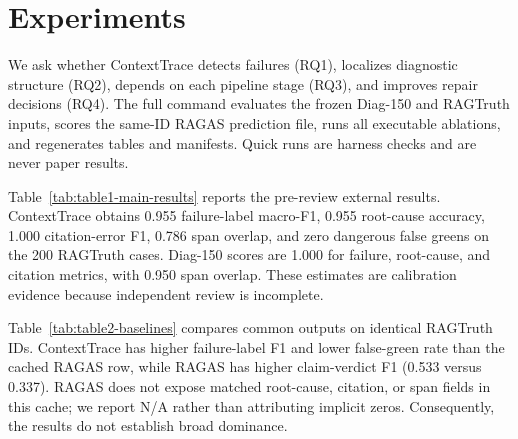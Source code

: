 \section{Experiments}
We ask whether ContextTrace detects failures (RQ1), localizes diagnostic
structure (RQ2), depends on each pipeline stage (RQ3), and improves repair
decisions (RQ4). The full command evaluates the frozen Diag-150 and RAGTruth
inputs, scores the same-ID RAGAS prediction file, runs all executable ablations,
and regenerates tables and manifests. Quick runs are harness checks and are
never paper results.

Table~\ref{tab:table1-main-results} reports the pre-review external results.
ContextTrace obtains 0.955 failure-label macro-F1, 0.955 root-cause accuracy,
1.000 citation-error F1, 0.786 span overlap, and zero dangerous false greens on
the 200 RAGTruth cases. Diag-150 scores are 1.000 for failure, root-cause, and
citation metrics, with 0.950 span overlap. These estimates are calibration
evidence because independent review is incomplete.

Table~\ref{tab:table2-baselines} compares common outputs on identical RAGTruth
IDs. ContextTrace has higher failure-label F1 and lower false-green rate than the
cached RAGAS row, while RAGAS has higher claim-verdict F1 (0.533 versus 0.337).
RAGAS does not expose matched root-cause, citation, or span fields in this cache;
we report N/A rather than attributing implicit zeros. Consequently, the results
do not establish broad dominance.



